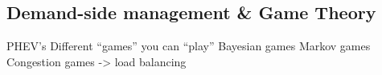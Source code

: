 \subsection{Demand-side management \& Game Theory}

PHEV’s
Different “games” you can “play”
Bayesian games
Markov games
Congestion games -> load balancing
